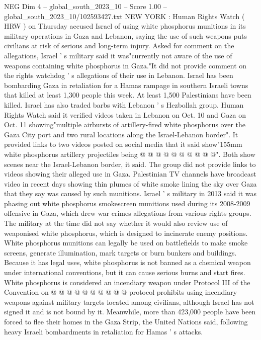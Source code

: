 \begin{textsample}{NEG Dim 4 – global\_south\_2023\_10 – Score 1.00 – global\_south\_2023\_10/102593427.txt}  \label{ex:f4_neg_024}
NEW YORK : Human Rights Watch ( HRW ) on Thursday accused Israel of using white phosphorus munitions in its military operations in Gaza and Lebanon, saying the use of such weapons puts civilians at risk of serious and long-term injury.
Asked for comment on the allegations, Israel ' s military said it was"currently not aware of the use of weapons containing white phosphorus in Gaza."It did not provide comment on the rights watchdog ' s allegations of their use in Lebanon.
Israel has been bombarding Gaza in retaliation for a Hamas rampage in southern Israeli towns that killed at least 1,300 people this week.
At least 1,500 Palestinians have been killed.
Israel has also traded barbs with Lebanon ' s Hezbollah group.
Human Rights Watch said it verified videos taken in Lebanon on Oct. 10 and Gaza on Oct. 11 showing"multiple airbursts of artillery-fired white phosphorus over the Gaza City port and two rural locations along the Israel-Lebanon border".
It provided links to two videos posted on social media that it said show"155mm white phosphorus artillery projectiles being @ @ @ @ @ @ @ @ @ @".
Both show scenes near the Israel-Lebanon border, it said.
The group did not provide links to videos showing their alleged use in Gaza.
Palestinian TV channels have broadcast video in recent days showing thin plumes of white smoke lining the sky over Gaza that they say was caused by such munitions.
Israel ' s military in 2013 said it was phasing out white phosphorus smokescreen munitions used during its 2008-2009 offensive in Gaza, which drew war crimes allegations from various rights groups.
The military at the time did not say whether it would also review use of weaponised white phosphorus, which is designed to incinerate enemy positions.
White phosphorus munitions can legally be used on battlefields to make smoke screens, generate illumination, mark targets or burn bunkers and buildings.
Because it has legal uses, white phosphorus is not banned as a chemical weapon under international conventions, but it can cause serious burns and start fires.
White phosphorus is considered an incendiary weapon under Protocol III of the Convention on @ @ @ @ @ @ @ @ @ @ protocol prohibits using incendiary weapons against military targets located among civilians, although Israel has not signed it and is not bound by it.
Meanwhile, more than 423,000 people have been forced to flee their homes in the Gaza Strip, the United Nations said, following heavy Israeli bombardments in retaliation for Hamas ' s attacks.

\end{textsample}
